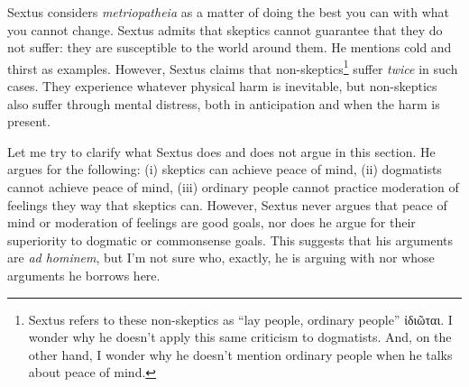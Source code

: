 Sextus considers \textit{metriopatheia} as a matter of doing the best you can with what you cannot change. Sextus admits that skeptics cannot guarantee that they do not suffer: they are susceptible to the world around them. He mentions cold and thirst as examples. However, Sextus claims that non-skeptics\footnote{Sextus refers to these non-skeptics as ``lay people, ordinary people'' \textgreek{ἰδιῶται}. I wonder why he doesn't apply this same criticism to dogmatists. And, on the other hand, I wonder why he doesn't mention ordinary people when he talks about peace of mind.} suffer \textit{twice} in such cases. They experience whatever physical harm is inevitable, but non-skeptics also suffer through mental distress, both in anticipation and when the harm is present.

Let me try to clarify what Sextus does and does not argue in this section. He argues for the following: (i) skeptics can achieve peace of mind, (ii) dogmatists cannot achieve peace of mind, (iii) ordinary people cannot practice moderation of feelings they way that skeptics can. However, Sextus never argues that peace of mind or moderation of feelings are good goals, nor does he argue for their superiority to dogmatic or commonsense goals. This suggests that his arguments are \textit{ad hominem}, but I'm not sure who, exactly, he is arguing with nor whose arguments he borrows here.
